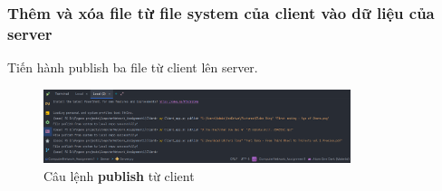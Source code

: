 \documentclass[a4paper]{article}
\begin{document}
	\subsubsection{Thêm và xóa file từ file system của client vào dữ liệu của server}
	Tiến hành publish ba file từ client lên server.
	\begin{figure}[h]
		\begin{center}
			\includegraphics[width=0.8\textwidth]{tests/publish_command.png}
			\hspace{\textwidth}
			\caption{Câu lệnh \textbf{publish} từ client}
			\label{publish_command}
		\end{center}
	\end{figure}
\end{document}

